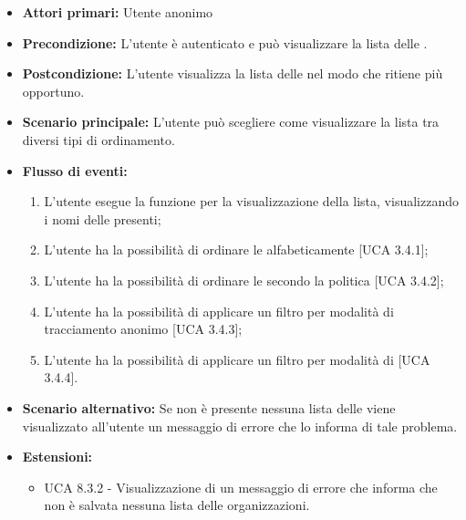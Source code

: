 \begin{itemize} 
	\item \textbf{Attori primari:} Utente anonimo
	\item \textbf{Precondizione:}  L'utente è autenticato e può visualizzare la lista delle .
	\item \textbf{Postcondizione:} L'utente visualizza la lista delle  nel modo che ritiene più opportuno.
	\item \textbf{Scenario principale:}	L'utente può scegliere come visualizzare la lista tra diversi tipi di ordinamento.
	\item \textbf{Flusso di eventi:}
	\begin{enumerate}
		\item L'utente esegue la funzione per la visualizzazione della lista, visualizzando i nomi delle  presenti;
		\item L'utente ha la possibilità di ordinare le  alfabeticamente [UCA 3.4.1];
		\item L'utente ha la possibilità di ordinare le  secondo la politica  [UCA 3.4.2];
		\item L'utente ha la possibilità di applicare un filtro per modalità di tracciamento anonimo [UCA 3.4.3];
		\item L'utente ha la possibilità di applicare un filtro per modalità di  [UCA 3.4.4].
	\end{enumerate}
	\item \textbf{Scenario alternativo:} Se non è presente nessuna lista delle  viene visualizzato all'utente un messaggio di errore che lo informa di tale problema.
	\item \textbf{Estensioni:}
	\begin{itemize}
		\item UCA 8.3.2 - Visualizzazione di un messaggio di errore che informa che non è salvata nessuna lista delle organizzazioni.
	\end{itemize}
\end{itemize}

